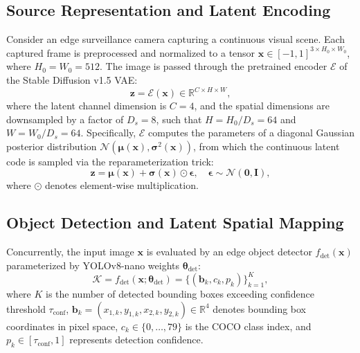 \documentclass[journal,twocolumn]{IEEEtran}
\begin{document}
\subsection{Source Representation and Latent Encoding}
Consider an edge surveillance camera capturing a continuous visual scene. Each captured frame is preprocessed and normalized to a tensor $\mathbf{x} \in [-1, 1]^{3 \times H_0 \times W_0}$, where $H_0 = W_0 = 512$. The image is passed through the pretrained encoder $\mathcal{E}$ of the Stable Diffusion v1.5 VAE:
\begin{equation}
\mathbf{z} = \mathcal{E}(\mathbf{x}) \in \mathbb{R}^{C \times H \times W},
\label{eq:vae_encode}
\end{equation}
where the latent channel dimension is $C = 4$, and the spatial dimensions are downsampled by a factor of $D_s = 8$, such that $H = H_0 / D_s = 64$ and $W = W_0 / D_s = 64$. Specifically, $\mathcal{E}$ computes the parameters of a diagonal Gaussian posterior distribution $\mathcal{N}(\boldsymbol{\mu}(\mathbf{x}), \boldsymbol{\sigma}^2(\mathbf{x}))$, from which the continuous latent code is sampled via the reparameterization trick:
\begin{equation}
\mathbf{z} = \boldsymbol{\mu}(\mathbf{x}) + \boldsymbol{\sigma}(\mathbf{x}) \odot \boldsymbol{\epsilon}, \quad \boldsymbol{\epsilon} \sim \mathcal{N}(\mathbf{0}, \mathbf{I}),
\label{eq:reparameterization}
\end{equation}
where $\odot$ denotes element-wise multiplication.

\subsection{Object Detection and Latent Spatial Mapping}
Concurrently, the input image $\mathbf{x}$ is evaluated by an edge object detector $f_{\text{det}}(\mathbf{x})$ parameterized by YOLOv8-nano weights $\boldsymbol{\theta}_{\text{det}}$:
\begin{equation}
\mathcal{K} = f_{\text{det}}(\mathbf{x}; \boldsymbol{\theta}_{\text{det}}) = \{(\mathbf{b}_k, c_k, p_k)\}_{k=1}^K,
\label{eq:detection_set}
\end{equation}
where $K$ is the number of detected bounding boxes exceeding confidence threshold $\tau_{\text{conf}}$, $\mathbf{b}_k = (x_{1,k}, y_{1,k}, x_{2,k}, y_{2,k}) \in \mathbb{R}^4$ denotes bounding box coordinates in pixel space, $c_k \in \{0, \dots, 79\}$ is the COCO class index, and $p_k \in [\tau_{\text{conf}}, 1]$ represents detection confidence.
\end{document}
